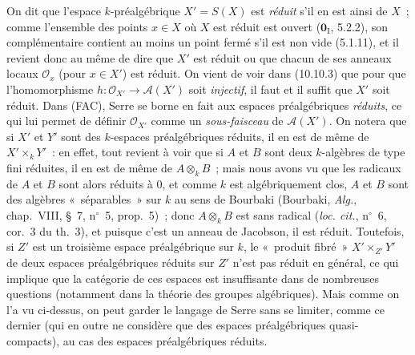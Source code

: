 \begin{env}[10.10.4]
\label{IV.10.10.4-fr}
On dit que l'espace $k$-préalgébrique $X'=S(X)$ est \emph{réduit} s'il en est
ainsi de $X$~; comme l'ensemble des points $x\in X$ où $X$ est réduit est
ouvert ($\mathbf 0_{\mathrm I}$, 5.2.2), son complémentaire contient au moins
un point fermé s'il est non vide (5.1.11), et il revient donc au même de dire
que $X'$ est réduit ou que chacun de ses anneaux locaux $\mathcal O_x$ (pour
$x\in X'$) est réduit. On vient de voir dans (10.10.3) que pour que
l'homomorphisme $h:\mathcal O_{X'}\to\mathcal A(X')$ soit \emph{injectif}, il
faut et il suffit que $X'$ soit réduit. Dans (FAC), Serre se borne en fait aux
espaces préalgébriques \emph{réduits}, ce qui lui permet de définir
$\mathcal O_{X'}$ comme un \emph{sous-faisceau} de $\mathcal A(X')$. On notera
que si $X'$ et $Y'$ sont des $k$-espaces préalgébriques réduits, il en est de
même de $X'\times_kY'$~: en effet, tout revient à voir que si $A$ et $B$ sont
deux $k$-algèbres de type fini réduites, il en est de même de $A\otimes_kB$~;
mais nous avons vu que les radicaux de $A$ et $B$ sont alors réduits à $0$, et
comme $k$ est algébriquement clos, $A$ et $B$ sont des algèbres «~séparables~»
sur $k$ au sens de Bourbaki (Bourbaki, \emph{Alg.}, chap.~VIII, \S~7,
n$^\circ$~5, prop.~5)~; donc $A\otimes_kB$ est sans radical (\emph{loc.
cit.}, n$^\circ$~6, cor.~3 du th.~3), et puisque c'est un anneau de Jacobson,
il est réduit. Toutefois, si $Z'$ est un troisième espace préalgébrique sur
$k$, le «~produit fibré~» $X'\times_{Z'}Y'$ de deux espaces préalgébriques
réduits sur $Z'$ n'est pas réduit en général, ce qui implique que la catégorie
de ces espaces est insuffisante dans de nombreuses questions (notamment dans
la théorie des groupes algébriques). Mais comme on l'a vu ci-dessus, on peut
garder le langage de Serre sans se limiter, comme ce dernier (qui en outre ne
considère que des espaces préalgébriques quasi-compacts), au cas des espaces
préalgébriques réduits.
\end{env}


